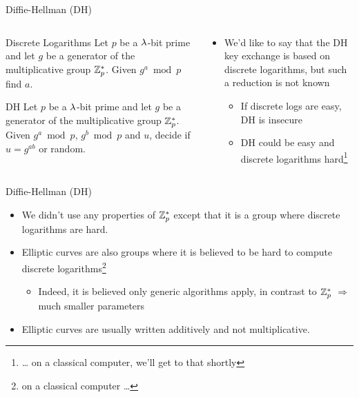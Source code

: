 \documentclass[xcolor=table,10pt,aspectratio=169]{beamer}
\begin{document}
\begin{frame}[label={sec:orgdfa8f6c}]{Diffie-Hellman (DH)}
\begin{columns}[t]
\begin{column}{0.5\columnwidth}
\begin{block}{Discrete Logarithms}
Let \(p\) be a \(\lambda\)-bit prime and let \(g\) be a generator of the multiplicative group \(\mathbb{Z}_{p}^{*}\). Given \(g^{a} \bmod p\) find \(a\).
\end{block}
\begin{block}{DH}
Let \(p\) be a \(\lambda\)-bit prime and let \(g\) be a generator of the multiplicative group \(\mathbb{Z}_{p}^{*}\). Given \(g^{a} \bmod p\), \(g^{b} \bmod p\) and \(u\), decide if \(u = g^{ab}\) or random.
\end{block}
{\footnotesize {} \par}
\end{column}
\begin{column}{0.5\columnwidth}
\begin{itemize}
\item We'd \alert{like} to say that the DH key exchange is based on discrete logarithms, but such a reduction is not known
\begin{itemize}
\item If discrete logs are easy, DH is insecure
\item DH could be easy and discrete logarithms hard\footnote{… on a classical computer, we'll get to that shortly}
\end{itemize}
\end{itemize}
\end{column}
\end{columns}
\end{frame}
\begin{frame}[label={sec:org9a9e72e}]{Diffie-Hellman (DH)}
\begin{itemize}
\item We didn't use any properties of \(\mathbb{Z}_{p}^{*}\) except that it is a group where discrete logarithms are hard.
\item Elliptic curves are also groups where it is believed to be hard to compute discrete logarithms\footnote{on a classical computer …}
\begin{itemize}
\item Indeed, it is believed only generic algorithms apply, in contrast to \(\mathbb{Z}_{p}^{*}\) \(\Rightarrow\) much smaller parameters
\end{itemize}
\item Elliptic curves are usually written additively and not multiplicative.
\end{itemize}
\end{frame}
\end{document}
